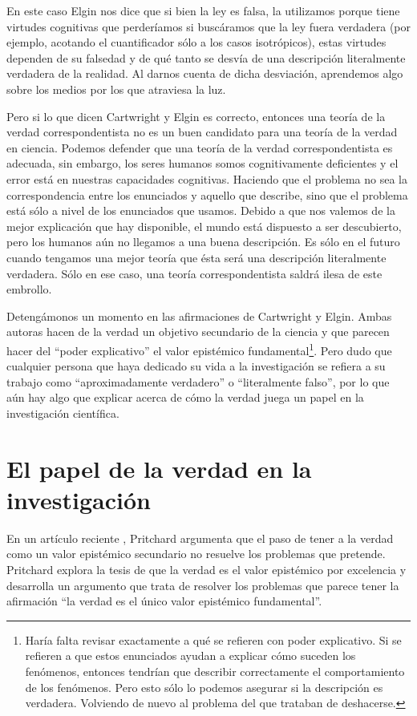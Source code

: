 En este caso Elgin nos dice que si bien la ley es falsa, la utilizamos porque tiene virtudes cognitivas que perderíamos si buscáramos que la ley fuera verdadera (por ejemplo, acotando el cuantificador sólo a los casos isotrópicos), estas virtudes dependen de su falsedad y de qué tanto se desvía de una descripción literalmente verdadera de la realidad. Al darnos cuenta de dicha desviación, aprendemos algo sobre los medios por los que atraviesa la luz.

Pero si lo que dicen Cartwright y Elgin es correcto, entonces una teoría de la verdad correspondentista no es un buen candidato para una teoría de la verdad en ciencia. Podemos defender que una teoría de la verdad correspondentista es adecuada, sin embargo, los seres humanos somos cognitivamente deficientes y el error está en nuestras capacidades cognitivas. Haciendo que el problema no sea la correspondencia entre los enunciados y aquello que describe, sino que el problema está sólo a nivel de los enunciados que usamos. Debido a que nos valemos de la mejor explicación que hay disponible, el mundo está dispuesto a ser descubierto, pero los humanos aún no llegamos a una buena descripción. Es sólo en el futuro cuando tengamos una mejor teoría que ésta será una descripción literalmente verdadera. Sólo en ese caso, una teoría correspondentista saldrá ilesa de este embrollo.

Detengámonos un momento en las afirmaciones de Cartwright y Elgin. Ambas autoras hacen de la verdad un objetivo secundario de la ciencia y que parecen hacer del ``poder explicativo'' el valor epistémico fundamental\footnote{Haría falta revisar exactamente a qué se refieren con poder explicativo. Si se refieren a que estos enunciados ayudan a explicar cómo suceden los fenómenos, entonces tendrían que describir correctamente el comportamiento de los fenómenos. Pero esto sólo lo podemos asegurar si la descripción es verdadera. Volviendo de nuevo al problema del que trataban de deshacerse.}. Pero dudo que cualquier persona que haya dedicado su vida a la investigación se refiera a su trabajo como ``aproximadamente verdadero'' o ``literalmente falso'', por lo que aún hay algo que explicar acerca de cómo la verdad juega un papel en la investigación científica.

\section{El papel de la verdad en la investigación}

\noindent En un artículo reciente \cite{Pritchard2019}, Pritchard argumenta que el paso de tener a la verdad como un valor epistémico secundario no resuelve los problemas que pretende. Pritchard explora la tesis de que la verdad es el valor epistémico por excelencia y desarrolla un argumento que trata de resolver los problemas que parece tener la afirmación ``la verdad es el único valor epistémico fundamental''.

